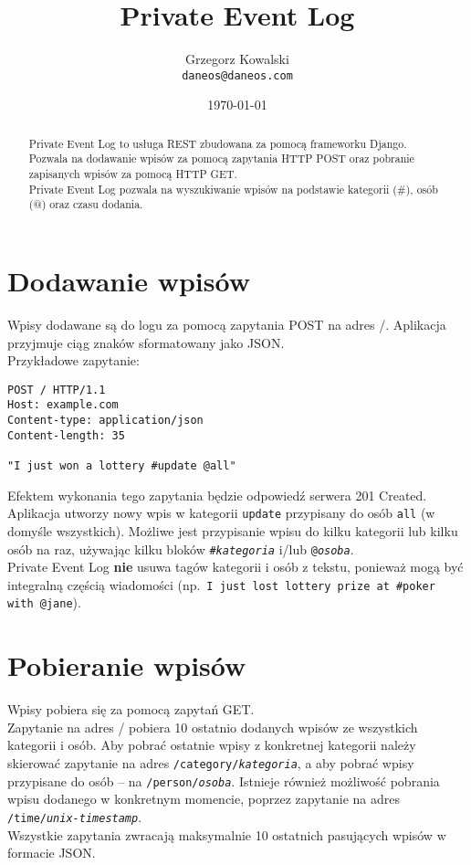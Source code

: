 \documentclass[12pt,a4paper]{article}
\title{Private Event Log}
\author{Grzegorz Kowalski\\\texttt{daneos@daneos.com}}
\date{\today}
\begin{document}
\maketitle

\begin{abstract}
Private Event Log to usługa REST zbudowana za pomocą frameworku Django.\\
Pozwala na dodawanie wpisów za pomocą zapytania HTTP POST oraz pobranie zapisanych wpisów za pomocą HTTP GET.\\
Private Event Log pozwala na wyszukiwanie wpisów na podstawie kategorii (\#), osób (@) oraz czasu dodania.
\end{abstract}

\section{Dodawanie wpisów}
Wpisy dodawane są do logu za pomocą zapytania POST na adres /.
Aplikacja przyjmuje ciąg znaków sformatowany jako JSON.\\
Przykładowe zapytanie:
\begin{verbatim}
POST / HTTP/1.1
Host: example.com
Content-type: application/json
Content-length: 35

"I just won a lottery #update @all"
\end{verbatim}
Efektem wykonania tego zapytania będzie odpowiedź serwera 201 Created.\\
Aplikacja utworzy nowy wpis w kategorii \texttt{update} przypisany do osób \texttt{all} (w domyśle wszystkich).
Możliwe jest przypisanie wpisu do kilku kategorii lub kilku osób na raz, używając kilku bloków \texttt{\#\emph{kategoria}} i/lub \texttt{@\emph{osoba}}.\\
Private Event Log \textbf{nie} usuwa tagów kategorii i osób z tekstu, ponieważ mogą być integralną częścią wiadomości (np.~\texttt{I just lost lottery prize at \#poker with @jane}).

\section{Pobieranie wpisów}
Wpisy pobiera się za pomocą zapytań GET.\\
Zapytanie na adres / pobiera 10 ostatnio dodanych wpisów ze wszystkich kategorii i osób.
Aby pobrać ostatnie wpisy z konkretnej kategorii należy skierować zapytanie na adres \texttt{/category/\emph{kategoria}}, a aby pobrać wpisy przypisane do osób -- na \texttt{/person/\emph{osoba}}. Istnieje również możliwość pobrania wpisu dodanego w konkretnym momencie, poprzez zapytanie na adres \texttt{/time/\emph{unix-timestamp}}.\\
Wszystkie zapytania zwracają maksymalnie 10 ostatnich pasujących wpisów w formacie JSON.
\end{document}
